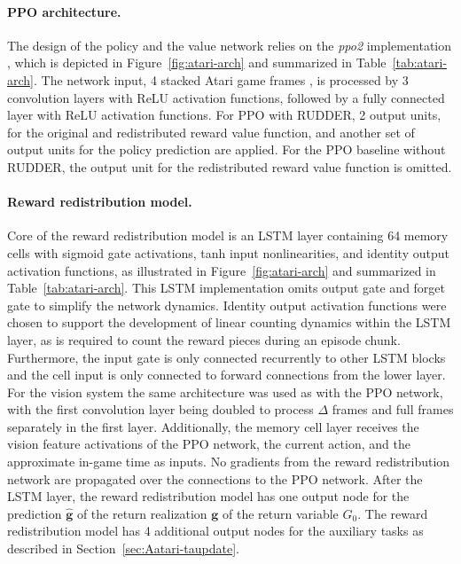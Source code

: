\documentclass{article}
\newcommand{\returnrealization}{\mathbf{g}}
\begin{document}
\begin{appendices}
\paragraph{PPO architecture.}
The design of the policy and the value network relies 
on the {\em ppo2} implementation \cite{Dhariwal:17}, which  
is depicted in Figure~\ref{fig:atari-arch} and 
summarized in Table~\ref{tab:atari-arch}.
The network input, 4 stacked Atari game frames \cite{Mnih:15},
is processed by 3 convolution layers with ReLU activation functions,
followed by a fully connected layer with ReLU activation functions.
For PPO with RUDDER,
2 output units, for the original and redistributed reward value function,
and another set of output units for the policy prediction are applied.
For the PPO baseline without RUDDER,
the output unit for the redistributed reward value function is omitted.


\paragraph{Reward redistribution model.}
Core of the reward redistribution model
is an LSTM layer containing 64 memory cells
with sigmoid gate activations, tanh input nonlinearities, 
and identity output activation functions, 
as illustrated in Figure~\ref{fig:atari-arch} 
and summarized in Table~\ref{tab:atari-arch}.
This LSTM implementation omits output gate and forget gate to simplify the network dynamics.
Identity output activation functions were chosen to support 
the development of linear counting dynamics within the LSTM layer, 
as is required to count the reward pieces during an episode chunk.
Furthermore, the input gate is only connected recurrently to other LSTM blocks and the
cell input is only connected to forward connections from the lower layer.
For the vision system the same architecture was used as with the PPO network,
with the first convolution layer being doubled to process
$\Delta$ frames and full frames separately in the first layer.
Additionally, the memory cell layer receives the vision feature activations
of the PPO network, the current action, and the approximate in-game time as inputs.
No gradients from the reward redistribution network are propagated over the connections to the PPO network.
After the LSTM layer, the reward redistribution model
has one output node for the prediction $\widehat{\returnrealization}$
of the return realization $\returnrealization$ of the return variable $G_0$.
The reward redistribution model has 4 additional
output nodes for the auxiliary tasks as described in Section~\ref{sec:Aatari-taupdate}.


\end{appendices}
\end{document}
